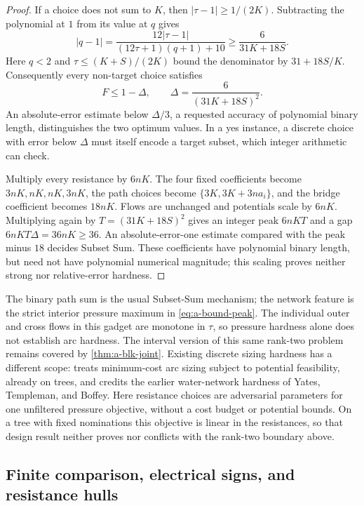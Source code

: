 \begin{proof}
If a choice does not sum to $K$, then $|\tau-1|\ge1/(2K)$.
Subtracting the polynomial at $1$ from its value at $q$ gives
\[
 |q-1|=\frac{12|\tau-1|}{(12\tau+1)(q+1)+10}
       \ge\frac6{31K+18S}.
\]
Here $q<2$ and $\tau\le(K+S)/(2K)$ bound the denominator by
$31+18S/K$. Consequently every non-target choice satisfies
\begin{equation}
 F\le1-\Delta,\qquad \Delta=\frac6{(31K+18S)^2}.
 \label{eq:a-bound-discrete-gap}
\end{equation}
An absolute-error estimate below $\Delta/3$, a requested accuracy of
polynomial binary length, distinguishes the two optimum values. In a
yes instance, a discrete choice with error below $\Delta$ must
itself encode a target subset, which integer arithmetic can check.

Multiply every resistance by $6nK$. The four fixed coefficients become
$3nK,nK,nK,3nK$, the path choices become
$\{3K,3K+3na_i\}$, and the bridge coefficient becomes $18nK$.
Flows are unchanged and potentials scale by $6nK$. Multiplying again by
$T=(31K+18S)^2$ gives an integer peak $6nKT$ and a gap
$6nKT\Delta=36nK\ge36$. An absolute-error-one estimate compared with
the peak minus $18$ decides Subset Sum. These coefficients have
polynomial binary length, but need not have polynomial numerical
magnitude; this scaling proves neither strong nor relative-error
hardness.
\end{proof}

The binary path sum is the usual Subset-Sum mechanism; the network
feature is the strict interior pressure maximum in
\cref{eq:a-bound-peak}. The individual outer and cross flows in this
gadget are monotone in $\tau$, so pressure hardness alone does not
establish arc hardness. The interval version of this same
rank-two problem remains covered by \cref{thm:a-blk-joint}.
Existing discrete sizing hardness has a different scope:
\citet[Theorem 4.7]{robinius2019-discrete-sizing} treats minimum-cost
arc sizing subject to potential feasibility, already on trees, and
credits the earlier water-network hardness of Yates, Templeman, and
Boffey. Here resistance choices are adversarial parameters for one
unfiltered pressure objective, without a cost budget or potential
bounds. On a tree with fixed nominations this objective is linear in
the resistances, so that design result neither proves nor conflicts
with the rank-two boundary above.

\subsection{Finite comparison, electrical signs, and resistance hulls}
\label{subsec:a-bound-hulls}


